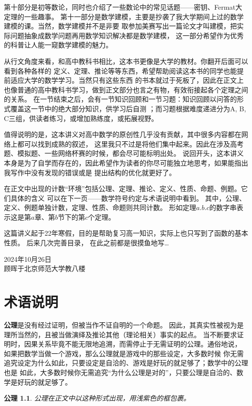 \documentclass[fontset=none]{ctexbook} %
\newtheorem{axiom}{公理}[section]
\theoremstyle{plain}
\numberwithin{equation}{subsection}%
\numberwithin{figure}{subsection}
\begin{document}
第十部分是初等数论，同时也介绍了一些数论中的常见话题——密钥、Fermat大定理的一些趣事。
第十一部分是数学建模，主要是抄袭了我大学期间上过的数学建模的课。当然，数学建模并不是非要
取参加美赛写出一篇论文才叫建模，把实际问题抽象成数学问题再用数学知识解决都是数学建模，
这一部分希望作为优秀的科普让人能一窥数学建模的魅力。

从行文角度来看，和高中教科书相比，这本书更像是大学的教材。你翻开后面可以看到各种各样的
定义、定理、推论等等东西，希望帮助阅读这本书的同学也能提前适应大学的数学学习。当然只有这些东西
的书本就过于死板了，因此在正文上也像普通的高中教科书学习，做到正文部分也言之有物，有效衔接起各个定理之间的关系。
在一节结束之后，会有一节知识回顾和一节习题：知识回顾以问答的形式覆盖这一节中的绝大部分知识，供学习后自测
；而习题根据难度递进分为A, B, C三组，供读者练习，或增加熟练度，或拓展视野。

值得说明的是，这本讲义对高中数学的原创性几乎没有贡献，其中很多内容都在网络上都可以找到成熟的叙述，
这里我只不过是将他们集中起来。因此在涉及高考题、模拟题、一些网络杯赛的时候，都会尽可能标明出处。
说回开头，这本讲义本身是为了自学而存在的，因此希望作为读者的你尽可能独立地思考，如果能指出我写作中没有发现的错误或是
提出结构的优化就更好了。

在正文中出现的计数“环境”包括公理、定理、推论、定义、性质、命题、例题。它们具体的含义
可以在下一页——数学符号约定与术语说明中看到。
其中，公理、定义、例题单独计数，定理、性质、命题则共同计数。
形如定理\(a.b.c\)的数字串表示这是第\(a\)章、第\(b\)节下的第\(c\)个定理。



这篇讲义起于22年寒假，目的是帮助复习高一知识，实际上也只写到了函数的基本性质。
后来几次完善目录，
在此之前都是很摸鱼地写\dots
\begin{flushright}
  2024年10月26日 \\
  顾晖于北京师范大学教八楼

\end{flushright}
\clearpage

\chapter{术语说明}


\textbf{公理}是没有经过证明，但被当作不证自明的一个命题。
因此，其真实性被视为是理所当然的，且被当做演绎及推论其他（理论相关）事实的起点。
当不断要求证明时，因果关系毕竟不能无限地追溯，而需停止于无需证明的公理。通俗地说，
如果把数学当做一个游戏，那么公理就是游戏中的那些设定，大多数时候
你无需追究设定为什么如此，只要设定是自洽的、游戏是好玩的就足够了；数学中的公理也是
如此，大多数时候你无需追究“为什么公理是对的”，只要公理是自洽的、数学是好玩的就足够了。
\begin{axiom}
  公理在正文中以这种形式出现，用浅紫色的框包裹。
\end{axiom}
\end{document}
